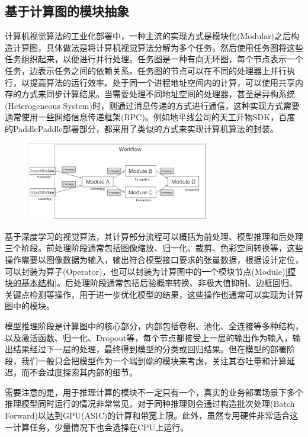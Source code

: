 \documentclass[master,anonymous]{shtthesis}
\begin{document}
\subsection{基于计算图的模块抽象}\label{基于计算图的模块抽象}
计算机视觉算法的工业化部署中，一种主流的实现方式是模块化(Modular)之后构造计算图，具体做法是将计算机视觉算法分解为多个任务\cite{arora1998thread}，然后使用任务图将这些任务组织起来，以便进行并行处理。任务图是一种有向无环图，每个节点表示一个任务，边表示任务之间的依赖关系。任务图的节点可以在不同的处理器上并行执行，以提高算法的运行效率。处于同一个进程地址空间内的计算，可以使用共享内存的方式来同步计算结果\cite{augonnet2009starpu}。当需要处理不同地址空间的处理器，甚至是异构系统(Heterogeneous System)时，则通过消息传递的方式进行通信，这种实现方式需要通常使用一些网络信息传递框架(RPC)。例如地平线公司的天工开物SDK，百度的PaddlePaddle\cite{ma2019paddlepaddle}部署部分，都采用了类似的方式来实现计算机算法的封装。

\begin{figure}[htbp]
	\centering
	\includegraphics[width=8cm]{img/workflow.png}
	\label{基于模块构造工作流}
\end{figure}

基于深度学习的视觉算法，其计算部分流程可以概括为前处理、模型推理和后处理三个阶段。前处理阶段通常包括图像缩放、归一化、裁剪、色彩空间转换等，这些操作需要以图像数据为输入，输出符合模型接口要求的张量数据，根据设计定位，可以封装为算子(Operator)，也可以封装为计算图中的一个模块节点(Module)\ref{模块的基本结构}。后处理阶段通常包括后验概率转换、非极大值抑制、边框回归、关键点检测等操作，用于进一步优化模型的结果，这些操作也通常可以实现为计算图中的模块。

模型推理阶段是计算图中的核心部分，内部包括卷积、池化、全连接等多种结构，以及激活函数、归一化、Dropout\cite{srivastava2014dropout}等，每个节点都接受上一层的输出作为输入，输出结果经过下一层的处理，最终得到模型的分类或回归结果。但在模型的部署阶段，我们一般只会把模型作为一个端到端的模块来考虑，关注其吞吐量和计算延迟，而不会过度探索其内部的细节。

需要注意的是，用于推理计算的模块不一定只有一个，真实的业务部署场景下多个推理模型同时运行的情况非常常见，对于同种推理则会通过构造批次处理(Batch Forward)\cite{mcclelland1987parallel}以达到GPU(ASIC)的计算和带宽上限。此外，虽然专用硬件非常适合这一计算任务，少量情况下也会选择在CPU上运行。
\end{document}
